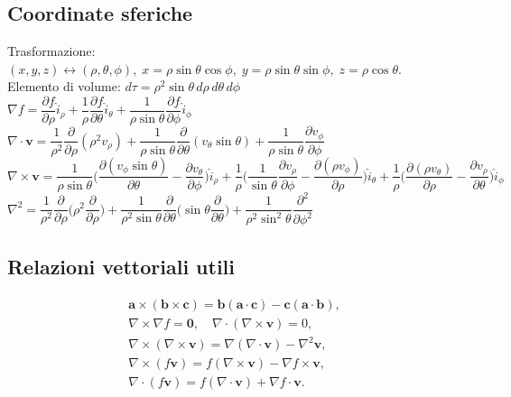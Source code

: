 \documentclass{book}
\begin{document}
\subsection*{Coordinate sferiche}
Trasformazione: $(x,y,z)\leftrightarrow(\rho,\theta,\phi),\;x=\rho\sin\theta\cos\phi,\;y=\rho\sin\theta\sin\phi,\;z=\rho\cos\theta$.\\[6pt]
Elemento di volume: $d\tau=\rho^2\sin\theta\,d\rho\,d\theta\,d\phi$\\[6pt]
$\nabla f=\dfrac{\partial f}{\partial\rho}\hat{i}_\rho+\dfrac{1}{\rho}\dfrac{\partial f}{\partial\theta}\hat{i}_\theta+\dfrac{1}{\rho\sin\theta}\dfrac{\partial f}{\partial\phi}\hat{i}_\phi$\\[6pt]
$\nabla\cdot\mathbf{v}=\dfrac{1}{\rho^2}\dfrac{\partial}{\partial\rho}(\rho^2 v_\rho)+\dfrac{1}{\rho\sin\theta}\dfrac{\partial}{\partial\theta}(v_\theta\sin\theta)+\dfrac{1}{\rho\sin\theta}\dfrac{\partial v_\phi}{\partial\phi}$\\[6pt]
$\nabla\times\mathbf{v}=\dfrac{1}{\rho\sin\theta}\Big(\dfrac{\partial(v_\phi\sin\theta)}{\partial\theta}-\dfrac{\partial v_\theta}{\partial\phi}\Big)\hat{i}_\rho+\dfrac{1}{\rho}\Big(\dfrac{1}{\sin\theta}\dfrac{\partial v_\rho}{\partial\phi}-\dfrac{\partial(\rho v_\phi)}{\partial\rho}\Big)\hat{i}_\theta+\dfrac{1}{\rho}\Big(\dfrac{\partial(\rho v_\theta)}{\partial\rho}-\dfrac{\partial v_\rho}{\partial\theta}\Big)\hat{i}_\phi$\\[6pt]
$\nabla^2=\dfrac{1}{\rho^2}\dfrac{\partial}{\partial\rho}\Big(\rho^2\dfrac{\partial}{\partial\rho}\Big)+\dfrac{1}{\rho^2\sin\theta}\dfrac{\partial}{\partial\theta}\Big(\sin\theta\dfrac{\partial}{\partial\theta}\Big)+\dfrac{1}{\rho^2\sin^2\theta}\dfrac{\partial^2}{\partial\phi^2}$

\subsection*{Relazioni vettoriali utili}
\begin{gather*}
\mathbf{a}\times(\mathbf{b}\times\mathbf{c})=\mathbf{b}(\mathbf{a}\cdot\mathbf{c})-\mathbf{c}(\mathbf{a}\cdot\mathbf{b}),\\[6pt]
\nabla\times\nabla f=\mathbf{0},\quad \nabla\cdot(\nabla\times\mathbf{v})=0,\\[6pt]
\nabla\times(\nabla\times\mathbf{v})=\nabla(\nabla\cdot\mathbf{v})-\nabla^2\mathbf{v},\\[6pt]
\nabla\times(f\mathbf{v})=f(\nabla\times\mathbf{v})-\nabla f\times\mathbf{v},\\[6pt]
\nabla\cdot(f\mathbf{v})=f(\nabla\cdot\mathbf{v})+\nabla f\cdot\mathbf{v}.
\end{gather*}
\end{document}
